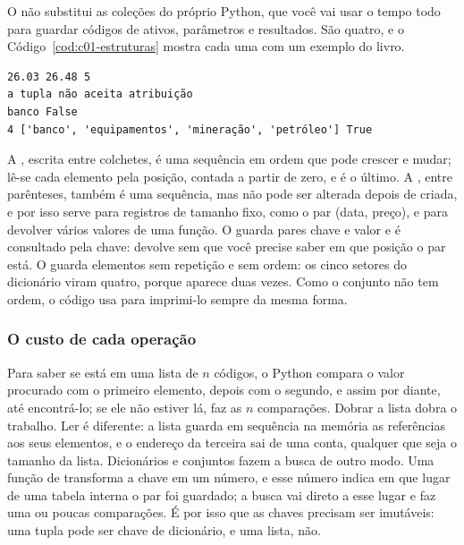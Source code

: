 O  não substitui as coleções do próprio Python, que você vai usar o tempo todo para guardar códigos de ativos, parâmetros e resultados. São quatro, e o Código~\ref{cod:c01-estruturas} mostra cada uma com um exemplo do livro.


\begin{lstlisting}[style=saida]
26.03 26.48 5
a tupla não aceita atribuição
banco False
4 ['banco', 'equipamentos', 'mineração', 'petróleo'] True
\end{lstlisting}

A , escrita entre colchetes, é uma sequência em ordem que pode crescer e mudar; lê-se cada elemento pela posição, contada a partir de zero, e  é o último. A , entre parênteses, também é uma sequência, mas não pode ser alterada depois de criada, e por isso serve para registros de tamanho fixo, como o par (data, preço), e para devolver vários valores de uma função. O  guarda pares chave e valor e é consultado pela chave:  devolve  sem que você precise saber em que posição o par está. O  guarda elementos sem repetição e sem ordem: os cinco setores do dicionário viram quatro, porque  aparece duas vezes. Como o conjunto não tem ordem, o código usa  para imprimi-lo sempre da mesma forma.

\subsubsection{O custo de cada operação}
Para saber se  está em uma lista de $n$ códigos, o Python compara o valor procurado com o primeiro elemento, depois com o segundo, e assim por diante, até encontrá-lo; se ele não estiver lá, faz as $n$ comparações. Dobrar a lista dobra o trabalho. Ler  é diferente: a lista guarda em sequência na memória as referências aos seus elementos, e o endereço da terceira sai de uma conta, qualquer que seja o tamanho da lista. Dicionários e conjuntos fazem a busca de outro modo. Uma função de  transforma a chave em um número, e esse número indica em que lugar de uma tabela interna o par foi guardado; a busca vai direto a esse lugar e faz uma ou poucas comparações. É por isso que as chaves precisam ser imutáveis: uma tupla pode ser chave de dicionário, e uma lista, não.

